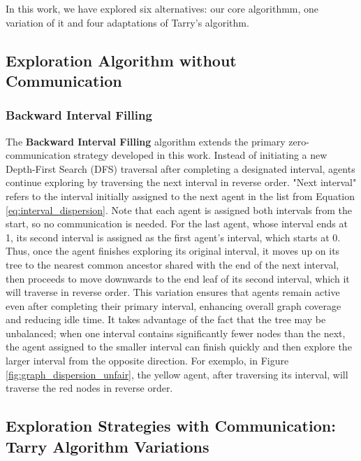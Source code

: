 In this work, we have explored six alternatives: our core algorithmm, one variation of it and four adaptations of Tarry's algorithm.

\subsection{Exploration Algorithm without Communication}
\label{section_method_zero_comm}

\subsubsection{Backward Interval Filling}
\label{section_backward_interval}

The \textbf{Backward Interval Filling} algorithm extends the primary zero-communication strategy developed in this work. Instead of initiating a new Depth-First Search (DFS) traversal after completing a designated interval, agents continue exploring by traversing the next interval in reverse order. "Next interval" refers to the interval initially assigned to the next agent in the list from Equation \ref{eq:interval_dispersion}. Note that each agent is assigned both intervals from the start, so no communication is needed. For the last agent, whose interval ends at 1, its second interval is assigned as the first agent's interval, which starts at 0. Thus, once the agent finishes exploring its original interval, it moves up on its tree to the nearest common ancestor shared with the end of the next interval, then proceeds to move downwards to the end leaf of its second interval, which it will traverse in reverse order. This variation ensures that agents remain active even after completing their primary interval, enhancing overall graph coverage and reducing idle time. It takes advantage of the fact that the tree may be unbalanced; when one interval contains significantly fewer nodes than the next, the agent assigned to the smaller interval can finish quickly and then explore the larger interval from the opposite direction. For exemplo, in Figure \ref{fig:graph_dispersion_unfair}, the yellow agent, after traversing its interval, will traverse the red nodes in reverse order.

\subsection{Exploration Strategies with Communication: Tarry Algorithm Variations}

\label{section_method_tarry_variations}

